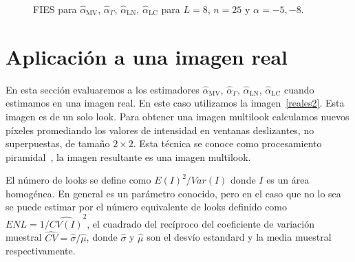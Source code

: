 \begin{figure}[htb]
	\caption{\label{InflL8n25}\small FIES para $\widehat{\alpha}_{\text{MV}}$, $\widehat{\alpha}_{\Gamma}$, $\widehat{\alpha}_{\text{LN}}$, $\widehat{\alpha}_{\text{LC}}$ para $L=8$, $n=25$ y $\alpha=-5,-8$.}
\end{figure}

\section{Aplicación a una imagen real}
\label{AplicacionImagenReal}

En esta sección evaluaremos a los estimadores $\widehat{\alpha}_{\text{MV}}$, $\widehat{\alpha}_{\Gamma}$, $\widehat{\alpha}_{\text{LN}}$, $\widehat{\alpha}_{\text{LC}}$ cuando estimamos en una imagen real. En este caso utilizamos la imagen~\ref{reales2}. Esta imagen es de un solo look. Para obtener una imagen multilook calculamos nuevos píxeles promediando los valores de intensidad en ventanas deslizantes, no superpuestas, de tamaño $2\times2$. Esta técnica se conoce como procesamiento piramidal~\cite{Adelson1984}, la imagen resultante es una imagen multilook. 

El número de looks se define como $E(I)^2/Var(I)$ donde $I$ es un área homogénea. En general es un parámetro conocido, pero en el caso que no lo sea se puede estimar por el número equivalente de looks definido como $ENL=1/\widehat{CV(I)}^2$, el cuadrado del recíproco del coeficiente de variación muestral $\widehat{CV}=\widehat{\sigma}/\widehat{\mu}$, donde $\widehat{\sigma}$ y $\widehat{\mu}$ son el desvío estandard y la media muestral respectivamente.

